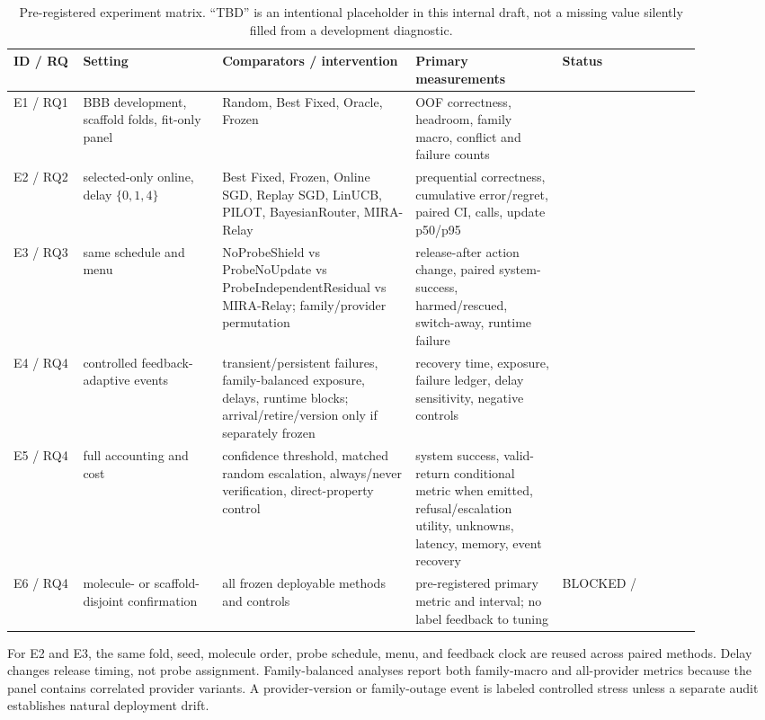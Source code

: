 \documentclass[sigconf,anonymous]{aamas}
\newcommand{\tbd}{\text{TBD}}
\begin{document}
\begin{table}[t]
\caption{Pre-registered experiment matrix. ``TBD'' is an intentional placeholder in this internal draft, not a missing value silently filled from a development diagnostic.}
\label{tab:matrix}
\small
\begin{tabular}{p{0.09\linewidth}p{0.18\linewidth}p{0.25\linewidth}p{0.19\linewidth}p{0.18\linewidth}}
\toprule
ID / RQ & Setting & Comparators / intervention & Primary measurements & Status \\
\midrule
E1 / RQ1 & BBB development, scaffold folds, fit-only panel & Random, Best Fixed, Oracle, Frozen & OOF correctness, headroom, family macro, conflict and failure counts & \tbd{} \\
E2 / RQ2 & selected-only online, delay $\{0,1,4\}$ & Best Fixed, Frozen, Online SGD, Replay SGD, LinUCB, PILOT, BayesianRouter, MIRA-Relay & prequential correctness, cumulative error/regret, paired CI, calls, update p50/p95 & \tbd{} \\
E3 / RQ3 & same schedule and menu & NoProbeShield vs ProbeNoUpdate vs ProbeIndependentResidual vs MIRA-Relay; family/provider permutation & release-after action change, paired system-success, harmed/rescued, switch-away, runtime failure & \tbd{} \\
E4 / RQ4 & controlled feedback-adaptive events & transient/persistent failures, family-balanced exposure, delays, runtime blocks; arrival/retire/version only if separately frozen & recovery time, exposure, failure ledger, delay sensitivity, negative controls & \tbd{} \\
E5 / RQ4 & full accounting and cost & confidence threshold, matched random escalation, always/never verification, direct-property control & system success, valid-return conditional metric when emitted, refusal/escalation utility, unknowns, latency, memory, event recovery & \tbd{} \\
E6 / RQ4 & molecule- or scaffold-disjoint confirmation & all frozen deployable methods and controls & pre-registered primary metric and interval; no label feedback to tuning & BLOCKED / \tbd{} \\
\bottomrule
\end{tabular}
\end{table}

For E2 and E3, the same fold, seed, molecule order, probe schedule, menu, and feedback clock are reused across paired methods. Delay changes release timing, not probe assignment. Family-balanced analyses report both family-macro and all-provider metrics because the panel contains correlated provider variants. A provider-version or family-outage event is labeled controlled stress unless a separate audit establishes natural deployment drift.
\end{document}
